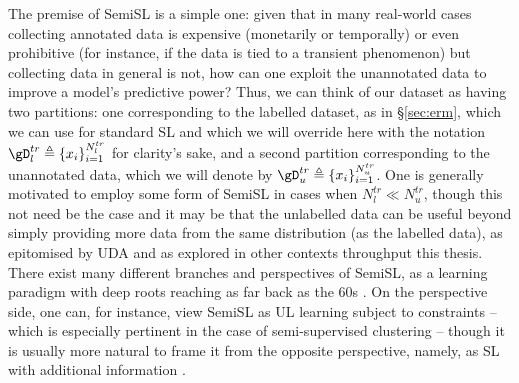 The premise of \ac{SemiSL} is a simple one: given that in many real-world cases collecting annotated
data is expensive (monetarily or temporally) or even prohibitive (for instance, if the data is tied
to a transient phenomenon) but collecting data in general is not, how can one exploit the
unannotated data to improve a model's predictive power?
%
Thus, we can think of our dataset as having two partitions: one corresponding to the labelled
dataset, as in \S\ref{sec:erm}, which we can use for standard \acl{SL} and which we will override
here with the notation \( \gD^{tr}_l \triangleq \{ x_i \}_{i=1}^{N^{tr}_l} \) for clarity's sake,
and a second partition corresponding to the unannotated data, which we will denote by \( \gD^{tr}_u
\triangleq \{ x_i \}_{i=1}^{N^{tr}_u} \).
%
One is generally motivated to employ some form of \ac{SemiSL} in cases when \( N^{tr}_l \ll
N^{tr}_u \), though this not need be the case and it may be that the unlabelled data can be useful
beyond simply providing more data from the same distribution (as the labelled data), as epitomised
by \ac{UDA} and as explored in other contexts throughput this thesis.
%
There exist many different branches and perspectives of \ac{SemiSL}, as a learning paradigm with deep
roots reaching as far back as the 60s \citep{scudder1965probability, fralick1967learning}. 
%
On the perspective side, one can, for instance, view \ac{SemiSL} as \ac{UL} learning subject to
constraints -- which is especially pertinent in the case of semi-supervised clustering
\citep{bair2013semi} -- though it is usually more natural to frame it from the opposite
perspective, namely, as \ac{SL} with additional information \citep{chapelle2009semi}.

